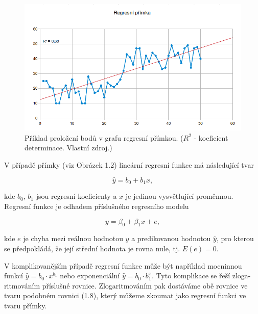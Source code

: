 \documentclass[a4paper,12pt,twoside]{scrreprt}
\begin{document}
\begin{figure}[h]
  \centering
  \includegraphics[width=15cm]{pictures/primka.png}
  \caption{Příklad proložení bodů v grafu regresní přímkou. \newline($R^2$ - koeficient determinace. Vlastní zdroj.)}
  \label{fig:přímka}
\end{figure}

V případě přímky (viz Obrázek 1.2) lineární regresní funkce má následující tvar

\begin{equation}
\hat{y} = b_0 + b_1x,
\end{equation}

kde $b_0$, $b_1$ jsou regresní koeficienty a $x$ je jedinou vysvětlující proměnnou. Regresní funkce je odhadem příslušného regresního modelu

\begin{equation}
y = \beta_0 + \beta_1x + e,
\end{equation}

kde $e$ je chyba mezi reálnou hodnotou $y$ a predikovanou hodnotou $\hat{y}$, pro kterou se předpokládá, že její střední hodnota je rovna nule, tj. $E(e) = 0$.

V komplikovanějším případě regresní funkce může být například mocninnou funkcí $\hat{y} = b_0 \cdot x^{b_1}$ nebo exponenciální $\hat{y} = b_0 \cdot b_1^x$. Tyto komplikace se řeší zloga-ritmováním příslušné rovnice. Zlogaritmováním pak dostáváme obě rovnice ve tvaru podobném rovnici (1.8), který můžeme zkoumat jako regresní funkci ve tvaru přímky.
\end{document}
